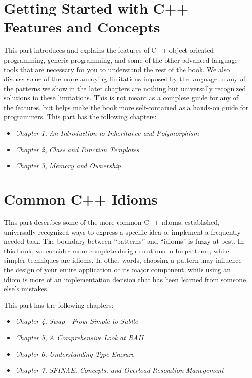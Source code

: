 \part{Getting Started with C++ Features and Concepts}

This part introduces and explains the features of C++ object-oriented programming, generic programming, and some of the other advanced language tools that are necessary for you to understand the rest of the book. We also discuss some of the more annoying limitations imposed by the language: many of the patterns we show in the later chapters are nothing but universally recognized solutions to these limitations. This is not meant as a complete guide for any of the features, but helps make the book more self-contained as a hands-on guide for programmers. This part has the following chapters:

\begin{itemize}
\item
  \emph{Chapter 1, An Introduction to Inheritance and Polymorphism}
\item
  \emph{Chapter 2, Class and Function Templates}
\item
  \emph{Chapter 3, Memory and Ownership}
\end{itemize}





\part{Common C++ Idioms}

This part describes some of the more common C++ idioms: established, universally recognized ways to express a specific idea or implement a frequently needed task. The boundary between ``patterns'' and ``idioms'' is fuzzy at best. In this book, we consider more complete design solutions to be patterns, while simpler techniques are idioms. In other words, choosing a pattern may influence the design of your entire application or its major component, while using an idiom is more of an implementation decision that has been learned from someone else's mistakes.

This part has the following chapters:

\begin{itemize}
\item
  \emph{Chapter 4, Swap - From Simple to Subtle}
\item
  \emph{Chapter 5, A Comprehensive Look at RAII}
\item
  \emph{Chapter 6, Understanding Type Erasure}
\item
  \emph{Chapter 7, SFINAE, Concepts, and Overload Resolution Management}
\end{itemize}



